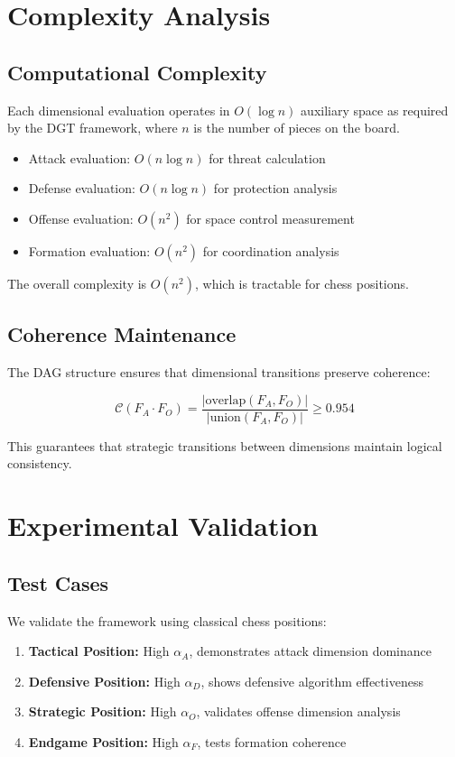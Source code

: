 \documentclass[12pt,a4paper]{article}
\begin{document}
\section{Complexity Analysis}

\subsection{Computational Complexity}

Each dimensional evaluation operates in $O(\log n)$ auxiliary space as required by the DGT framework, where $n$ is the number of pieces on the board.

\begin{itemize}
\item Attack evaluation: $O(n \log n)$ for threat calculation
\item Defense evaluation: $O(n \log n)$ for protection analysis  
\item Offense evaluation: $O(n^2)$ for space control measurement
\item Formation evaluation: $O(n^2)$ for coordination analysis
\end{itemize}

The overall complexity is $O(n^2)$, which is tractable for chess positions.

\subsection{Coherence Maintenance}

The DAG structure ensures that dimensional transitions preserve coherence:

$$\mathcal{C}(F_A \cdot F_O) = \frac{|\text{overlap}(F_A, F_O)|}{|\text{union}(F_A, F_O)|} \geq 0.954$$

This guarantees that strategic transitions between dimensions maintain logical consistency.

\section{Experimental Validation}

\subsection{Test Cases}

We validate the framework using classical chess positions:

\begin{enumerate}
\item \textbf{Tactical Position:} High $\alpha_A$, demonstrates attack dimension dominance
\item \textbf{Defensive Position:} High $\alpha_D$, shows defensive algorithm effectiveness  
\item \textbf{Strategic Position:} High $\alpha_O$, validates offense dimension analysis
\item \textbf{Endgame Position:} High $\alpha_F$, tests formation coherence
\end{enumerate}
\end{document}
